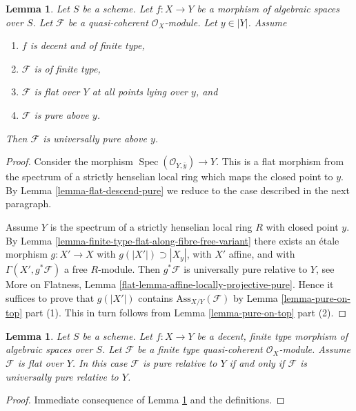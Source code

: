 \documentclass{stacks-project}
\theoremstyle{plain}
\newtheorem{lemma}[subsection]{Lemma}
\theoremstyle{definition}
\theoremstyle{remark}
\numberwithin{equation}{subsection}
\def\Spec{\mathop{\mathrm{Spec}}}
\begin{document}
\begin{lemma}
\label{lemma-finite-type-flat-pure-along-fibre-is-universal}
Let $S$ be a scheme. Let $f : X \to Y$ be a morphism of algebraic
spaces over $S$.
Let $\mathcal{F}$ be a quasi-coherent $\mathcal{O}_X$-module.
Let $y \in |Y|$.
Assume
\begin{enumerate}
\item $f$ is decent and of finite type,
\item $\mathcal{F}$ is of finite type,
\item $\mathcal{F}$ is flat over $Y$ at all points lying over $y$, and
\item $\mathcal{F}$ is pure above $y$.
\end{enumerate}
Then $\mathcal{F}$ is universally pure above $y$.
\end{lemma}

\begin{proof}
Consider the morphism $\Spec(\mathcal{O}_{Y, \overline{y}}) \to Y$.
This is a flat morphism from the spectrum of a strictly henselian
local ring which maps the closed point to $y$.
By Lemma \ref{lemma-flat-descend-pure} we reduce to the case
described in the next paragraph.

\medskip\noindent
Assume $Y$ is the spectrum of a strictly henselian local ring $R$
with closed point $y$.
By Lemma \ref{lemma-finite-type-flat-along-fibre-free-variant}
there exists an \'etale morphism $g : X' \to X$ with
$g(|X'|) \supset |X_y|$, with $X'$ affine, and with
$\Gamma(X', g^*\mathcal{F})$ a free $R$-module.
Then $g^*\mathcal{F}$ is universally pure relative to $Y$, see
More on Flatness, Lemma \ref{flat-lemma-affine-locally-projective-pure}.
Hence it suffices to prove that
$g(|X'|)$ contains $\text{Ass}_{X/Y}(\mathcal{F})$
by Lemma \ref{lemma-pure-on-top} part (1).
This in turn follows from
Lemma \ref{lemma-pure-on-top} part (2).
\end{proof}

\begin{lemma}
\label{lemma-finite-type-flat-pure-is-universal}
Let $S$ be a scheme.
Let $f : X \to Y$ be a decent, finite type morphism of algebraic
spaces over $S$.
Let $\mathcal{F}$ be a finite type quasi-coherent $\mathcal{O}_X$-module.
Assume $\mathcal{F}$ is flat over $Y$. In this case
$\mathcal{F}$ is pure relative to $Y$ if and only if $\mathcal{F}$
is universally pure relative to $Y$.
\end{lemma}

\begin{proof}
Immediate consequence of
Lemma \ref{lemma-finite-type-flat-pure-along-fibre-is-universal}
and the definitions.
\end{proof}
\end{document}
